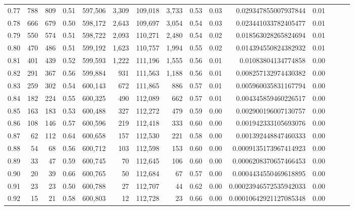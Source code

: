 \begin{tabular}{rrrrrrrrrrrrrrr}
0.77 &     788 &    809 &  0.51 &  597,506 &    3,309 &  109,018 &    3,733 &  0.53 &  0.03 &    0.029347855007937844 &      0.01 \\
0.78 &     666 &    679 &  0.50 &  598,172 &    2,643 &  109,697 &    3,054 &  0.54 &  0.03 &    0.023441033782405477 &      0.01 \\
0.79 &     550 &    574 &  0.51 &  598,722 &    2,093 &  110,271 &    2,480 &  0.54 &  0.02 &    0.018563028265824694 &      0.01 \\
0.80 &     470 &    486 &  0.51 &  599,192 &    1,623 &  110,757 &    1,994 &  0.55 &  0.02 &    0.014394550824382932 &      0.01 \\
0.81 &     401 &    439 &  0.52 &  599,593 &    1,222 &  111,196 &    1,555 &  0.56 &  0.01 &     0.01083804134774858 &      0.00 \\
0.82 &     291 &    367 &  0.56 &  599,884 &      931 &  111,563 &    1,188 &  0.56 &  0.01 &    0.008257132974430382 &      0.00 \\
0.83 &     259 &    302 &  0.54 &  600,143 &      672 &  111,865 &      886 &  0.57 &  0.01 &    0.005960035831167794 &      0.00 \\
0.84 &     182 &    224 &  0.55 &  600,325 &      490 &  112,089 &      662 &  0.57 &  0.01 &    0.004345859460226517 &      0.00 \\
0.85 &     163 &    183 &  0.53 &  600,488 &      327 &  112,272 &      479 &  0.59 &  0.00 &    0.002900196007130757 &      0.00 \\
0.86 &     108 &    146 &  0.57 &  600,596 &      219 &  112,418 &      333 &  0.60 &  0.00 &    0.001942333105693076 &      0.00 \\
0.87 &      62 &    112 &  0.64 &  600,658 &      157 &  112,530 &      221 &  0.58 &  0.00 &    0.001392448847460333 &      0.00 \\
0.88 &      54 &     68 &  0.56 &  600,712 &      103 &  112,598 &      153 &  0.60 &  0.00 &   0.0009135173967414923 &      0.00 \\
0.89 &      33 &     47 &  0.59 &  600,745 &       70 &  112,645 &      106 &  0.60 &  0.00 &   0.0006208370657466453 &      0.00 \\
0.90 &      20 &     39 &  0.66 &  600,765 &       50 &  112,684 &       67 &  0.57 &  0.00 &   0.0004434550469618895 &      0.00 \\
0.91 &      23 &     23 &  0.50 &  600,788 &       27 &  112,707 &       44 &  0.62 &  0.00 &  0.00023946572535942033 &      0.00 \\
0.92 &      15 &     21 &  0.58 &  600,803 &       12 &  112,728 &       23 &  0.66 &  0.00 &  0.00010642921127085348 &      0.00 \\

\end{tabular}
